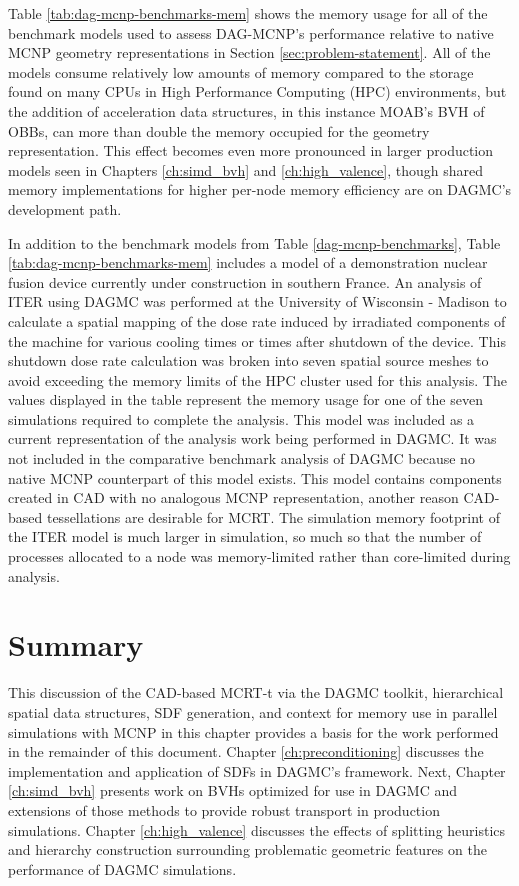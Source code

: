 Table \ref{tab:dag-mcnp-benchmarks-mem} shows the memory usage for all of the
benchmark models used to assess DAG-MCNP's performance relative to native MCNP
geometry representations in Section \ref{sec:problem-statement}. All of the
models consume relatively low amounts of memory compared to the storage found on
many CPUs in High Performance Computing (HPC) environments, but the addition of
acceleration data structures, in this instance MOAB's BVH of OBBs, can more than
double the memory occupied for the geometry representation. This effect becomes
even more pronounced in larger production models seen in Chapters
\ref{ch:simd_bvh} and \ref{ch:high_valence}, though shared memory
implementations for higher per-node memory efficiency are on DAGMC's development
path.

In addition to the benchmark models from Table \ref{dag-mcnp-benchmarks}, Table
\ref{tab:dag-mcnp-benchmarks-mem} includes a model of a demonstration nuclear
fusion device currently under construction in southern France.  An analysis of
ITER using DAGMC was performed at the University of Wisconsin - Madison to
calculate a spatial mapping of the dose rate induced by irradiated components of
the machine for various cooling times or times after shutdown of the device.
This shutdown dose rate calculation was broken into seven spatial source meshes
to avoid exceeding the memory limits of the HPC cluster used for this
analysis. The values displayed in the table represent the memory usage for one
of the seven simulations required to complete the analysis. This model was
included as a current representation of the analysis work being performed in
DAGMC. It was not included in the comparative benchmark analysis of DAGMC
because no native MCNP counterpart of this model exists. This model contains
components created in CAD with no analogous MCNP representation, another reason
CAD-based tessellations are desirable for MCRT. The simulation memory footprint
of the ITER model is much larger in simulation, so much so that the number of
processes allocated to a node was memory-limited rather than core-limited during
analysis.

\section{Summary}

This discussion of the CAD-based MCRT-t via the DAGMC toolkit, hierarchical
spatial data structures, SDF generation, and context for memory use in parallel
simulations with MCNP in this chapter provides a basis for the work performed in
the remainder of this document. Chapter
\ref{ch:preconditioning} discusses the implementation and application of SDFs in
DAGMC's framework. Next, Chapter \ref{ch:simd_bvh} presents work on BVHs
optimized for use in DAGMC and extensions of those methods to provide robust
transport in production simulations. Chapter \ref{ch:high_valence} discusses the
effects of splitting heuristics and hierarchy construction surrounding
problematic geometric features on the performance of DAGMC simulations.
